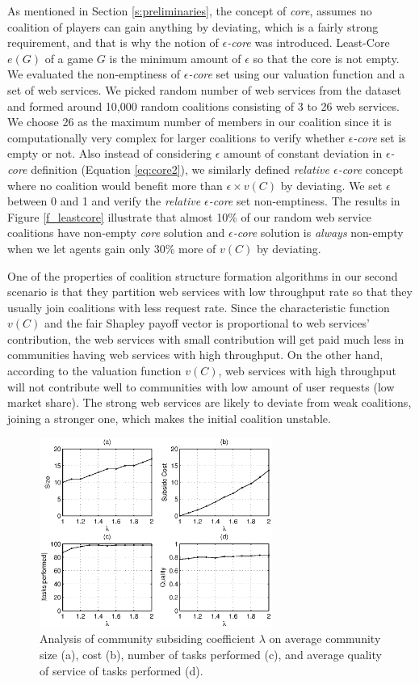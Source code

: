 \documentclass[10pt,journal,cspaper,compsoc]{IEEEtran}
\begin{document}
As mentioned in Section \ref{s:preliminaries}, the concept of
\emph{core}, assumes no coalition of players can gain anything by
deviating, which is a fairly strong requirement, and that is why
the notion of \emph{$\epsilon$-core} was introduced. Least-Core
$e(G)$ of a game $G$ is the minimum amount of $\epsilon$ so that
the core is not empty. We evaluated the non-emptiness of
\emph{$\epsilon$-core} set using our valuation function and a set
of web services. We picked random number of web services from the
dataset and formed around 10,000 random coalitions consisting of 3
to 26 web services. We choose 26 as the maximum number of members
in our coalition since it is computationally very complex for
larger coalitions to verify whether \emph{$\epsilon$-core} set is
empty or not. Also instead of considering $\epsilon$ amount of
constant deviation in \emph{$\epsilon$-core} definition (Equation
\ref{eq:core2}), we similarly defined \emph{relative
$\epsilon$-core} concept where no coalition would benefit more
than \emph{$\epsilon \times v(C)$} by deviating. We set $\epsilon$
between 0 and 1 and verify the \emph{relative $\epsilon$-core} set
non-emptiness. The results in Figure \ref{f_leastcore} illustrate
that almost 10\% of our random web service coalitions have
non-empty \emph{core} solution and \emph{$\epsilon$-core} solution
is \emph{always} non-empty when we let agents gain only 30\% more
of $v(C)$ by deviating.

One of the properties of coalition structure formation algorithms
in our second scenario is that they partition web services with
low throughput rate so that they usually join coalitions with less
request rate. Since the characteristic function $v(C)$ and the
fair Shapley payoff vector is proportional to web services'
contribution, the web services with small contribution will get
paid much less in communities having web services with high
throughput. On the other hand, according to the valuation function
$v(C)$, web services with high throughput will not contribute well
to communities with low amount of user requests (low market
share). The strong web services are likely to deviate from weak
coalitions, joining a stronger one, which makes the initial
coalition unstable.


\begin{figure}[!t]
\centering
\includegraphics[width=3in]{taxtation.eps}
\caption{Analysis of community subsiding coefficient $\lambda$ on
average community size (a), cost (b), number of tasks performed
(c), and average quality of service of tasks performed (d).}
\label{f_taxtation}
\end{figure}
\end{document}

